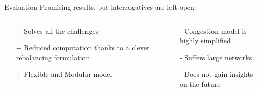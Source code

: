 \begin{frame}{Evaluation}
	\hspace{0.5cm} Promising results, but interrogatives are left open. 
	\vspace{0.5cm}
	\begin{columns}
		\begin{column}{0.35\textwidth}
			
			\begin{itemize}
				\item[+] Solves all the challenges
				\item[+] Reduced computation thanks to a clever rebalancing formulation
				\item[+] Flexible and Modular model
			\end{itemize}
		\end{column}
		\vline
		\hspace{0.8cm}
		\begin{column}{0.4\textwidth}
			\begin{itemize}
				\item[-] Congestion model is highly simplified
				\item[-] Suffers large networks 
				\item[-] Does not gain insights on the future
			\end{itemize}
		\end{column}
	\end{columns}
\end{frame}
